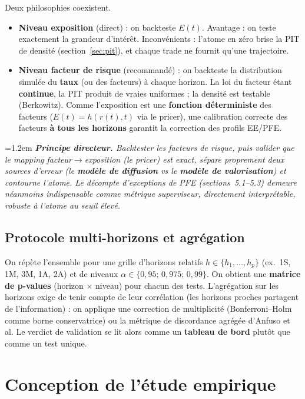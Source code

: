 \documentclass[11pt,a4paper]{article}
\newenvironment{remarque}
  {\par\smallskip\noindent\begin{minipage}{\linewidth}\leftskip=1.2em
   \footnotesize\itshape}
  {\end{minipage}\par\smallskip}
\theoremstyle{remark}
\begin{document}
Deux philosophies coexistent.
\begin{itemize}[nosep]
  \item \textbf{Niveau exposition} (direct) : on backteste $E(t)$. Avantage : on teste exactement la grandeur d'intérêt. Inconvénients : l'atome en zéro brise la PIT de densité (section~\ref{sec:pit}), et chaque trade ne fournit qu'une trajectoire.
  \item \textbf{Niveau facteur de risque} (recommandé) : on backteste la distribution simulée du \textbf{taux} (ou des facteurs) à chaque horizon. La loi du facteur étant \textbf{continue}, la PIT produit de vraies uniformes ; la densité est testable (Berkowitz). Comme l'exposition est une \textbf{fonction déterministe} des facteurs ($E(t)=h(r(t),t)$ via le pricer), une calibration correcte des facteurs \textbf{à tous les horizons} garantit la correction des profils EE/PFE.
\end{itemize}

\begin{remarque}
\textbf{Principe directeur.} Backtester les facteurs de risque, puis valider que le mapping facteur$\to$exposition (le pricer) est exact, sépare proprement deux sources d'erreur (le \textbf{modèle de diffusion} vs le \textbf{modèle de valorisation}) et contourne l'atome. Le décompte d'exceptions de PFE (sections~5.1--5.3) demeure néanmoins indispensable comme métrique superviseur, directement interprétable, robuste à l'atome au seuil élevé.
\end{remarque}

\subsection{Protocole multi-horizons et agrégation}

On répète l'ensemble pour une grille d'horizons relatifs $h \in \{h_1, \dots, h_p\}$ (ex.\ 1S, 1M, 3M, 1A, 2A) et de niveaux $\alpha \in \{0{,}95;\,0{,}975;\,0{,}99\}$. On obtient une \textbf{matrice de p-values} (horizon $\times$ niveau) pour chacun des tests. L'agrégation sur les horizons exige de tenir compte de leur corrélation (les horizons proches partagent de l'information) : on applique une correction de multiplicité (Bonferroni--Holm comme borne conservatrice) ou la métrique de discordance agrégée d'Anfuso et al. Le verdict de validation se lit alors comme un \textbf{tableau de bord} plutôt que comme un test unique.

\section{Conception de l'étude empirique}
\label{sec:empirique}
\end{document}
